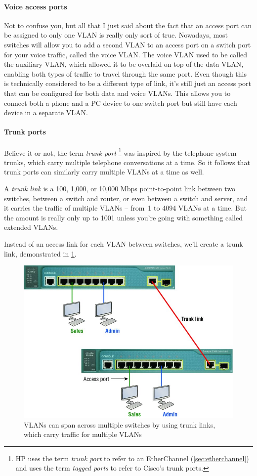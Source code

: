 \documentclass[b5paper,11pt]{memoir}
\begin{document}
\paragraph{Voice access ports}
Not to confuse you, but all that I just said about the fact that an access port can be assigned to only one VLAN is really only sort of true.
Nowadays, most switches will allow you to add a second VLAN to an access port on a switch port for your voice traffic,
called the voice VLAN. The voice VLAN used to be called the auxiliary
VLAN, which allowed it to be overlaid on top of the data VLAN, enabling
both types of traffic to travel through the same port. Even though this
is technically considered to be a different type of link, it's still
just an access port that can be configured for both data and voice
VLANs. This allows you to connect both a phone and a PC device to one
switch port but still have each device in a separate VLAN.

\paragraph{Trunk ports}
Believe it or not, the term \emph{trunk port}%
\footnote{HP uses the term \emph{trunk port} to refer to an EtherChannel (\vref{sec:etherchannel}) and uses the term \emph{tagged ports} to refer to Cisco's trunk ports.}
was inspired by the telephone system trunks, which carry multiple telephone conversations at a time.
So it follows that trunk ports can similarly carry multiple VLANs at a time as well.

A \emph{trunk link} is a 100, 1,000, or 10,000 Mbps point-to-point link between two switches, between a switch and router, or even between a switch and server, and it carries the traffic of multiple VLANs -- from~1 to 4094 VLANs at a time.
But the amount is really only up to 1001 unless you're going with something called extended VLANs.

Instead of an access link for each VLAN between switches, we'll create a trunk link, demonstrated in \cref{fig:trunk-links}.

\begin{figure}
   \centering
   \includegraphics{images/c11f006.jpg}
   \caption{VLANs can span across multiple switches by using trunk links, which carry traffic for multiple VLANs}
   \label{fig:trunk-links}
\end{figure}
\end{document}
